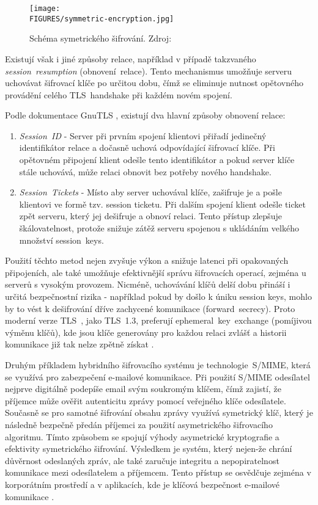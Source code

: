 \begin{figure}[htbp]
    \centering
    \texttt{[image: \\FIGURES/symmetric-encryption.jpg]}
    \caption{Schéma symetrického šifrování. Zdroj: \parencite{cloudflare2024}}
    \label{fig:symmetric-encryption}
\end{figure}

Existují však i jiné způsoby relace, například v případě takzvaného \emph{session~resumption} (obnovení~relace). Tento mechanismus umožňuje serveru uchovávat šifrovací klíče po určitou dobu, čímž se eliminuje nutnost opětovného provádění celého TLS~handshake při každém novém spojení.

Podle dokumentace GnuTLS \textcite{gnutls2024}, existují dva hlavní způsoby obnovení relace:
\begin {enumerate}
\item \textit{Session~ID} - Server při prvním spojení klientovi přiřadí jedinečný identifikátor relace a dočasně uchová odpovídající šifrovací klíče. Při opětovném připojení klient odešle tento identifikátor a pokud server klíče stále uchovává, může relaci obnovit bez potřeby nového handshake.
\item \textit{Session~Tickets} - Místo aby server uchovával klíče, zašifruje je a pošle klientovi ve formě tzv. session ticketu. Při dalším spojení klient odešle ticket zpět serveru, který jej dešifruje a obnoví relaci. Tento přístup zlepšuje škálovatelnost, protože snižuje zátěž serveru spojenou s ukládáním velkého množství session~keys.
\end {enumerate}

Použití těchto metod nejen zvyšuje výkon a snižuje latenci při opakovaných připojeních, ale také umožňuje efektivnější správu šifrovacích operací, zejména u serverů s vysokým provozem. Nicméně, uchovávání klíčů delší dobu přináší i určitá bezpečnostní rizika - například pokud by došlo k úniku session keys, mohlo by to vést k dešifrování dříve zachycené komunikace (forward~secrecy).
Proto moderní verze TLS~, jako TLS~1.3, preferují ephemeral~key~exchange (pomíjivou výměnu klíčů), kde jsou klíče generovány pro každou relaci zvlášť a historii komunikace již tak nelze zpětně získat \parencite{gnutls2024}. 

Druhým příkladem hybridního šifrovacího systému je technologie~S/MIME, která se využívá pro zabezpečení e-mailové komunikace. Při použití S/MIME odesílatel nejprve digitálně podepíše email svým soukromým klíčem, čímž zajistí, že příjemce může ověřit autenticitu zprávy pomocí veřejného klíče odesílatele. Současně se pro samotné šifrování obsahu zprávy využívá symetrický klíč, který je následně bezpečně předán příjemci za použití asymetrického šifrovacího algoritmu. Tímto způsobem se spojují výhody asymetrické kryptografie a efektivity symetrického šifrování.
Výsledkem je systém, který nejen-že chrání důvěrnost odeslaných zpráv, ale také zaručuje integritu a nepopiratelnost komunikace mezi odesílatelem a příjemcem. Tento přístup se osvědčuje zejména v korporátním prostředí a v aplikacích, kde je klíčová bezpečnost e-mailové komunikace \parencite{cloudflare2024}.

\newpage